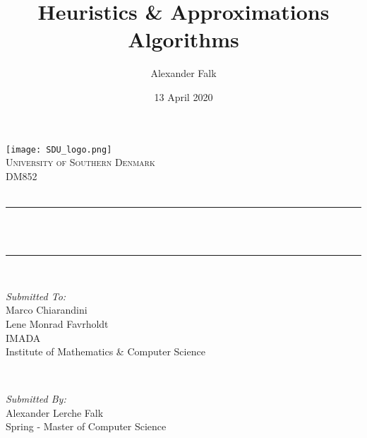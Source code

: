 \documentclass[12pt]{article}
\title{Heuristics \& Approximations Algorithms}								%
\author{Alexander Falk}								%
\date{13 April 2020}											%
\makeatletter
\let\thetitle\@title
\let\thedate\@date
\makeatother
\begin{document}

\begin{titlepage}
	\centering
    \vspace*{0.5 cm}
    \texttt{[image: SDU\_logo.png]}\\[1.0 cm]	%
    \textsc{\LARGE University of Southern Denmark}\\[2.0 cm]	%
	\textsc{\Large DM852}\\[0.5 cm]				%
	\textsc{\Large \thedate}\\[0.5 cm]				%
	\rule{\linewidth}{0.2 mm} \\[0.4 cm]
	{ \huge \bfseries \thetitle}\\
	\rule{\linewidth}{0.2 mm} \\[1.5 cm]
	
	\begin{minipage}{0.4\textwidth}
		\begin{flushleft} \large
			\emph{Submitted To:}\\
			Marco Chiarandini\\
            Lene Monrad Favrholdt \\
			IMADA \\
			Institute of Mathematics \& Computer Science\\
			\end{flushleft}
			\end{minipage}~
			\begin{minipage}{0.4\textwidth}
            
			\begin{flushright} \large
			\emph{Submitted By:} \\
			Alexander Lerche Falk\\
            Spring - Master of Computer Science\\
		\end{flushright}
        
	\end{minipage}\\[2 cm]
	
	
    
    
    
    
	
\end{titlepage}


\tableofcontents
\pagebreak
\end{document}

